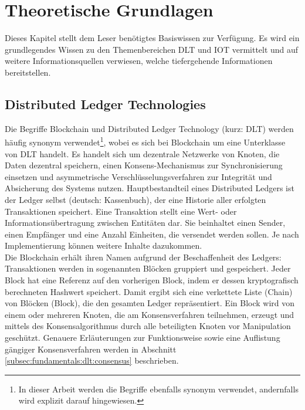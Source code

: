 \chapter{Theoretische Grundlagen}
\label{ch:fundamentals}
Dieses Kapitel stellt dem Leser benötigtes Basiswissen zur Verfügung. Es wird ein grundlegendes Wissen zu den Themenbereichen \ac{DLT} und \ac{IOT} vermittelt und auf weitere Informationsquellen verwiesen, welche tiefergehende Informationen bereitstellen.

%
%
\section{Distributed Ledger Technologies}
\label{sec:fundamentals:dlt}
Die Begriffe Blockchain und Distributed Ledger Technology (kurz: \ac{DLT}) werden häufig synonym verwendet\footnote{In dieser Arbeit werden die Begriffe ebenfalls synonym verwendet, andernfalls wird explizit darauf hingewiesen.}, wobei es sich bei Blockchain um eine Unterklasse von \ac{DLT} handelt. Es handelt sich um dezentrale Netzwerke von Knoten, die Daten dezentral speichern, einen Konsens-Mechanismus zur Synchronisierung einsetzen und asymmetrische Verschlüsselungsverfahren zur Integrität und Absicherung des Systems nutzen. Hauptbestandteil eines Distributed Ledgers ist der Ledger selbst (deutsch: Kassenbuch), der eine Historie aller erfolgten Transaktionen speichert. Eine Transaktion stellt eine Wert- oder Informationsübertragung zwischen Entitäten dar. Sie beinhaltet einen Sender, einen Empfänger und eine Anzahl Einheiten, die versendet werden sollen. Je nach Implementierung können weitere Inhalte dazukommen.\\
Die Blockchain erhält ihren Namen aufgrund der Beschaffenheit des Ledgers: Transaktionen werden in sogenannten Blöcken gruppiert und gespeichert. Jeder Block hat eine Referenz auf den vorherigen Block, indem er dessen kryptografisch berechneten Hashwert speichert. Damit ergibt sich eine verkettete Liste (Chain) von Blöcken (Block), die den gesamten Ledger repräsentiert. Ein Block wird von einem oder mehreren Knoten, die am Konsensverfahren teilnehmen, erzeugt und mittels des Konsensalgorithmus durch alle beteiligten Knoten vor Manipulation geschützt. Genauere Erläuterungen zur Funktionsweise sowie eine Auflistung gängiger Konsensverfahren werden in Abschnitt \ref{subsec:fundamentals:dlt:consensus} beschrieben.\\

